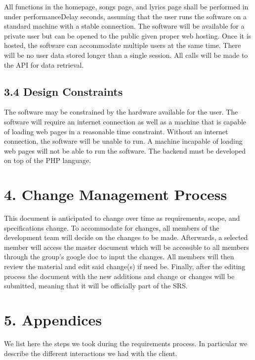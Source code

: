 \documentclass[]{article}
\begin{document}
All functions in the homepage, songs page, and lyrics page shall be
performed in under performanceDelay seconds, assuming that the user runs
the software on a standard machine with a stable connection. The
software will be available for a private user but can be opened to the
public given proper web hosting. Once it is hosted, the software can
accommodate multiple users at the same time. There will be no user data
stored longer than a single session. All calls will be made to the API
for data retrieval.

\subsection{3.4 Design Constraints}\label{design-constraints}

The software may be constrained by the hardware available for the user.
The software will require an internet connection as well as a machine
that is capable of loading web pages in a reasonable time constraint.
Without an internet connection, the software will be unable to run. A
machine incapable of loading web pages will not be able to run the
software. The backend must be developed on top of the PHP language.

\section{4. Change Management Process}\label{change-management-process}

This document is anticipated to change over time as requirements, scope,
and specifications change. To accommodate for changes, all members of
the development team will decide on the changes to be made. Afterwards,
a selected member will access the master document which will be
accessible to all members through the group's google doc to input the
changes. All members will then review the material and edit said
change(s) if need be. Finally, after the editing process the document
with the new additions and change or changes will be submitted, meaning
that it will be officially part of the SRS.

\section{5. Appendices}\label{appendices}

We list here the steps we took during the requirements process. In
particular we describe the different interactions we had with the
client.
\end{document}
